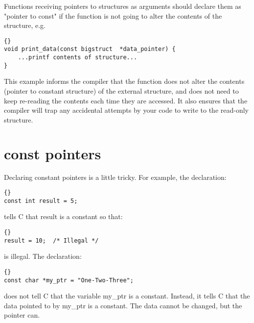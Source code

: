 \documentclass{report}
\begin{document}
Functions receiving pointers to structures as arguments should declare them as "pointer to const" if the function is not going to alter the contents of the structure, e.g. 
\begin{lstlisting}{}
void print_data(const bigstruct  *data_pointer) {
    ...printf contents of structure...
}
\end{lstlisting}
This example informs the compiler that the function does not alter the contents (pointer to constant structure) of the external structure, and does not need to keep re-reading the contents each time they are accessed. It also ensures that the compiler will trap any accidental attempts by your code to write to the read-only structure. 


\section{const pointers}
Declaring constant pointers is a little tricky. For example, the declaration:
\begin{lstlisting}{}
const int result = 5;
\end{lstlisting}
tells C that result is a constant so that:
\begin{lstlisting}{}
result = 10;  /* Illegal */
\end{lstlisting}
is illegal. The declaration:
\begin{lstlisting}{}
const char *my_ptr = "One-Two-Three";
\end{lstlisting}
does not tell C that the variable my\_ptr is a constant. Instead, it tells C that the data pointed to by my\_ptr is a constant. The data cannot be changed, but the pointer can.
\end{document}
